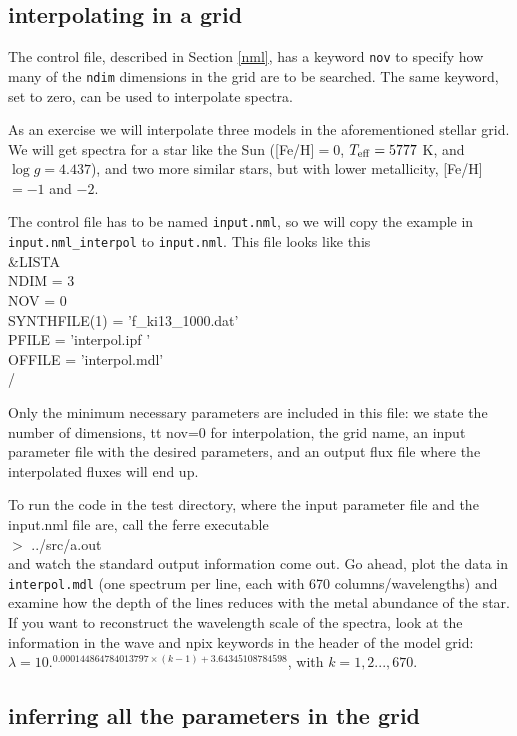 \documentclass[12pt]{article}
\begin{document}
\subsection{interpolating in a grid}

The control file, described in Section \ref{nml}, has a keyword 
{\tt nov} to specify how many of the {\tt ndim} dimensions in the grid are to be 
searched. The same keyword, set to zero, can be used to interpolate spectra.

As an exercise we will interpolate three models in the aforementioned stellar grid. 
We will get spectra for a star like the Sun ([Fe/H]$=0$, $T_{\rm eff}=5777$ K,  
and $\log g=4.437$), and two more similar stars, but with lower metallicity, [Fe/H]$=-1$ and $-2$. 

The control file has to be named {\tt input.nml}, so we will copy the example
in \\
{\tt input.nml\_interpol} to {\tt input.nml}. This file looks like this \\
 \&LISTA \\
 NDIM = 3 \\
 NOV = 0 \\
 SYNTHFILE(1) = 'f\_ki13\_1000.dat' \\
 PFILE = 'interpol.ipf ' \\
 OFFILE = 'interpol.mdl' \\
 \// 


Only the minimum necessary parameters are included in this file: we state the 
number of dimensions, {tt nov=0} for interpolation, the grid name, an input 
parameter file with the desired parameters, and an output flux file where the 
interpolated fluxes will end up. 

To run the code in the test directory, where the input parameter file and the 
input.nml file are, call the ferre executable \\
$>$ ../src/a.out \\
and watch the standard output information come out. Go ahead, plot the data 
in {\tt interpol.mdl} (one spectrum per line, each with 670 columns/wavelengths) 
and examine how the depth of the lines reduces with the metal abundance of the star. 
If you want to reconstruct the wavelength scale of the spectra, look at the 
information in the {\sc wave} and {\sc npix} keywords in the header of the model 
grid: $\lambda = 10.^{0.000144864784013797 \times (k-1) + 3.64345108784598}$, with $k=1,2...,670$.



\subsection{inferring all the parameters in the grid}
\end{document}

